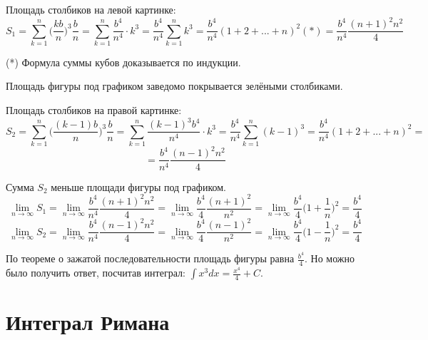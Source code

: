 	\begin{explanation}
	Площадь столбиков на левой картинке:
	\[ S_1 = \sum_{k = 1}^n \bigg(\frac{kb}{n}\bigg)^3 \frac{b}{n} = \sum_{k = 1}^n \frac{b^4}{n^4} \cdot k^3 = \frac{b^4}{n^4} \sum_{k = 1}^n k^3 = \frac{b^4}{n^4} (1 + 2 + ... + n)^2 (*) = \frac{b^4}{n^4} \frac{(n + 1)^2n^2}{4} \]
	
	(*) Формула суммы кубов доказывается по индукции.
	
	Площадь фигуры под графиком заведомо покрывается зелёными столбиками.
	
	Площадь столбиков на правой картинке:
	\[ S_2 = \sum_{k = 1}^n \bigg(\frac{(k - 1)b}{n}\bigg)^3 \frac{b}{n} = \sum_{k = 1}^n \frac{(k - 1)^3b^4}{n^4} \cdot k^3 = \frac{b^4}{n^4} \sum_{k = 1}^n (k - 1)^3 = \frac{b^4}{n^4} (1 + 2 + ... + n)^2 = \]
	\[ = \frac{b^4}{n^4} \frac{(n - 1)^2n^2}{4} \]
	
	Сумма $S_2$ меньше площади фигуры под графиком.
	\[ \lim_{n \to \infty} S_1 = \lim_{n \to \infty} \frac{b^4}{n^4} \frac{(n + 1)^2n^2}{4} = \lim_{n \to \infty} \frac{b^4}{4} \frac{(n + 1)^2}{n^2} = \lim_{n \to \infty} \frac{b^4}{4} \bigg(1 + \frac{1}{n}\bigg)^2 = \frac{b^4}{4} \]
	\[ \lim_{n \to \infty} S_2 = \lim_{n \to \infty} \frac{b^4}{n^4} \frac{(n - 1)^2n^2}{4} = \lim_{n \to \infty} \frac{b^4}{4} \frac{(n - 1)^2}{n^2} = \lim_{n \to \infty} \frac{b^4}{4} \bigg(1 - \frac{1}{n}\bigg)^2 = \frac{b^4}{4} \]
	
	По теореме о зажатой последовательности площадь фигуры равна $\frac{b^4}{4}$. Но можно было получить ответ, посчитав интеграл: $\displaystyle\int x^3 dx = \frac{x^4}{4} + C$.
	\end{explanation}
	
	\section{Интеграл Римана}
	
